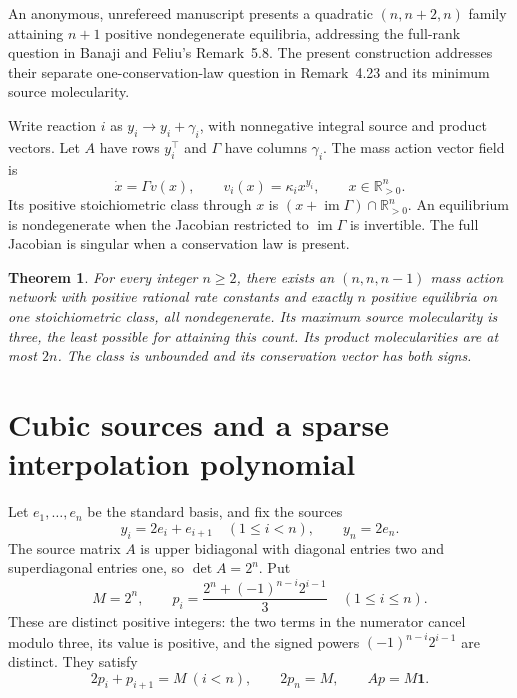\documentclass[11pt]{amsart}
\newtheorem{theorem}{Theorem}
\newcommand{\Rpos}{\mathbb R_{>0}}
\newcommand{\one}{\mathbf 1}
\begin{document}
An anonymous, unrefereed manuscript \cite{anonymous2026} presents a quadratic
$(n,n+2,n)$ family attaining $n+1$ positive nondegenerate equilibria,
addressing the full-rank question in Banaji and Feliu's Remark~5.8.
The present construction addresses their separate one-conservation-law
question in Remark~4.23 and its minimum source molecularity.

Write reaction $i$ as $y_i\to y_i+\gamma_i$, with nonnegative integral
source and product vectors. Let $A$ have rows $y_i^\top$ and $\Gamma$
have columns $\gamma_i$. The mass action vector field is
\begin{equation}\label{eq:field}
 \dot x=\Gamma v(x),\qquad v_i(x)=\kappa_i x^{y_i},\qquad x\in\Rpos^n.
\end{equation}
Its positive stoichiometric class through $x$ is
$(x+\operatorname{im}\Gamma)\cap\Rpos^n$. An equilibrium is
nondegenerate when the Jacobian restricted to
$\operatorname{im}\Gamma$ is invertible. The full Jacobian is singular
when a conservation law is present.

\begin{theorem}\label{thm:main}
For every integer $n\ge2$, there exists an $(n,n,n-1)$ mass action
network with positive rational rate constants and exactly $n$ positive
equilibria on one stoichiometric class, all nondegenerate. Its maximum
source molecularity is three, the least possible for attaining this
count. Its product molecularities are at most $2n$. The class is unbounded
and its conservation vector has both signs.
\end{theorem}

\section{Cubic sources and a sparse interpolation polynomial}
Let $e_1,\ldots,e_n$ be the standard basis, and fix the sources
\begin{equation}\label{eq:sources}
 y_i=2e_i+e_{i+1}\quad(1\le i<n),\qquad y_n=2e_n.
\end{equation}
The source matrix $A$ is upper bidiagonal with diagonal entries two and
superdiagonal entries one, so $\det A=2^n$. Put
\begin{equation}\label{eq:powers}
 M=2^n,\qquad
 p_i=\frac{2^n+(-1)^{n-i}2^{i-1}}3\quad(1\le i\le n).
\end{equation}
These are distinct positive integers: the two terms in the numerator
cancel modulo three, its value is positive, and the signed powers
$(-1)^{n-i}2^{i-1}$ are distinct. They satisfy
\begin{equation}\label{eq:weighted}
 2p_i+p_{i+1}=M\ (i<n),\qquad 2p_n=M,
 \qquad Ap=M\one.
\end{equation}
\end{document}
